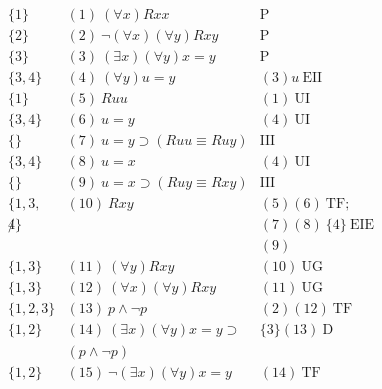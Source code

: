 \[
\begin{array}{lll}
\{1\}   & (1)\ (\forall x) Rxx  & \mathrm{P}\\
\{2\}   & (2)\ \neg (\forall x)(\forall y) Rxy  & \mathrm{P}\\
\{3\}   & (3)\ (\exists x)(\forall y) x = y  & \mathrm{P}\\
\{3,4\}   & (4)\ (\forall y) u = y  & (3)u\ \mathrm{EII}\\
\{1\}   & (5)\ Ruu  & (1)\ \mathrm{UI}\\
\{3,4\}   & (6)\ u=y  & (4)\ \mathrm{UI}\\
\{\}   & (7)\ u=y \supset (Ruu \equiv Ruy) & \mathrm{III}\\
\{3,4\}   & (8)\ u=x  & (4)\ \mathrm{UI}\\
\{\}   & (9)\ u=x \supset (Ruy \equiv Rxy) & \mathrm{III}\\
\{1,3,   & (10)\ Rxy  & (5)(6)\ \mathrm{TF};\\
\not4\} &  & (7)(8)\ \{4\}\ \mathrm{EIE} \\
 & & (9)\\
\{1,3\}   & (11)\ (\forall y)Rxy  & (10)\ \mathrm{UG}\\
\{1,3\}   & (12)\ (\forall x)(\forall y)Rxy  & (11)\ \mathrm{UG}\\
\{1,2,3\}   & (13)\ p \wedge \neg p  & (2)(12)\ \mathrm{TF}\\
\{1,2\}   & (14)\ (\exists x)(\forall y) x = y  \supset
& \{3\}(13)\ \mathrm{D}\\
 & (p \wedge \neg p) & \\
\{1,2\}   & (15)\ \neg (\exists x)(\forall y) x = y  & (14)\ \mathrm{TF}
\end{array}
\]
\fi